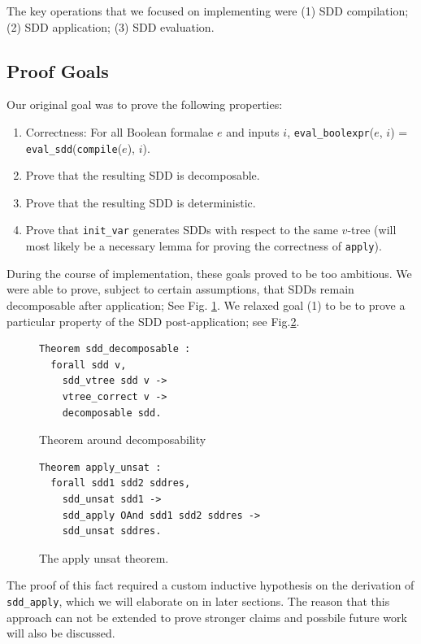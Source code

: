 \documentclass[twocolumn]{article}
\theoremstyle{definition}
\begin{document}
The key operations that we focused on implementing were (1) SDD compilation; 
(2) SDD application; (3) SDD evaluation. 

\subsection{Proof Goals}
Our original goal was to prove the following properties:
  \begin{enumerate}
  \item Correctness: For all Boolean formalae $e$ and inputs $i$,
    \texttt{eval\_boolexpr}($e$, $i$) =
    \texttt{eval\_sdd}(\texttt{compile}($e$),  $i$).
  \item Prove that the resulting SDD is decomposable.
  \item Prove that the resulting SDD is deterministic.
  \item Prove that \texttt{init\_var} generates SDDs with respect to the same
    $v$-tree (will most likely be a necessary lemma for proving the correctness
    of \texttt{apply}).
  \end{enumerate} 
During the course of implementation, these goals proved to be too ambitious. We
were able to prove, subject to certain assumptions, that SDDs remain
decomposable after application; See Fig. \ref{fig:decomposable}. We relaxed goal (1) to be to prove a particular
property of the SDD post-application; see Fig.\ref{fig:unsatthm}.

\begin{figure}
\begin{verbatim}
Theorem sdd_decomposable :
  forall sdd v,
    sdd_vtree sdd v ->
    vtree_correct v ->
    decomposable sdd.
\end{verbatim}
  \caption{Theorem around decomposability}
  \label{fig:decomposable}
\end{figure}

\begin{figure}
\begin{verbatim}
Theorem apply_unsat :
  forall sdd1 sdd2 sddres,
    sdd_unsat sdd1 ->
    sdd_apply OAnd sdd1 sdd2 sddres ->
    sdd_unsat sddres.
\end{verbatim}
  \caption{The apply unsat theorem.}
  \label{fig:unsatthm}
\end{figure}
The proof of this fact required a custom inductive hypothesis on the derivation
of \texttt{sdd\_apply}, which we will elaborate on in later sections. The reason
that this approach can not be extended to prove stronger claims and possbile
future work will also be discussed.
\end{document}
